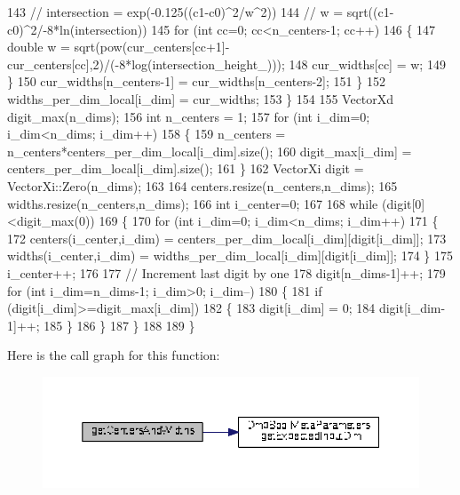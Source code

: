 \begin{DoxyCode}
143       \textcolor{comment}{// intersection = exp(-0.125((c1-c0)^2/w^2))}
144       \textcolor{comment}{//            w = sqrt((c1-c0)^2/-8*ln(intersection))}
145       \textcolor{keywordflow}{for} (\textcolor{keywordtype}{int} cc=0; cc<n\_centers-1; cc++)
146       \{
147         \textcolor{keywordtype}{double} w = sqrt(pow(cur\_centers[cc+1]-cur\_centers[cc],2)/(-8*log(intersection\_height\_)));
148         cur\_widths[cc] = w;
149       \}
150       cur\_widths[n\_centers-1] = cur\_widths[n\_centers-2];
151     \}
152     widths\_per\_dim\_local[i\_dim] = cur\_widths;
153   \}
154 
155   VectorXd digit\_max(n\_dims);
156   \textcolor{keywordtype}{int} n\_centers = 1;
157   \textcolor{keywordflow}{for} (\textcolor{keywordtype}{int} i\_dim=0; i\_dim<n\_dims; i\_dim++)
158   \{
159     n\_centers = n\_centers*centers\_per\_dim\_local[i\_dim].size();
160     digit\_max[i\_dim] = centers\_per\_dim\_local[i\_dim].size();
161   \}
162   VectorXi digit = VectorXi::Zero(n\_dims);
163   
164   centers.resize(n\_centers,n\_dims);
165   widths.resize(n\_centers,n\_dims);
166   \textcolor{keywordtype}{int} i\_center=0;
167 
168   \textcolor{keywordflow}{while} (digit[0]<digit\_max(0))
169   \{
170     \textcolor{keywordflow}{for} (\textcolor{keywordtype}{int} i\_dim=0; i\_dim<n\_dims; i\_dim++)
171     \{
172       centers(i\_center,i\_dim) = centers\_per\_dim\_local[i\_dim][digit[i\_dim]];
173       widths(i\_center,i\_dim) = widths\_per\_dim\_local[i\_dim][digit[i\_dim]];
174     \}
175     i\_center++;
176   
177     \textcolor{comment}{// Increment last digit by one}
178     digit[n\_dims-1]++;
179     \textcolor{keywordflow}{for} (\textcolor{keywordtype}{int} i\_dim=n\_dims-1; i\_dim>0; i\_dim--)
180     \{
181       \textcolor{keywordflow}{if} (digit[i\_dim]>=digit\_max[i\_dim])
182       \{
183         digit[i\_dim] = 0;
184         digit[i\_dim-1]++;
185       \}
186     \}
187   \}
188   
189 \}
\end{DoxyCode}


Here is the call graph for this function\+:
\nopagebreak
\begin{figure}[H]
\begin{center}
\leavevmode
\includegraphics[width=350pt]{classDmpBbo_1_1MetaParametersRBFN_ab4dfc7a149e6637cb3e610ad827e3477_cgraph}
\end{center}
\end{figure}


